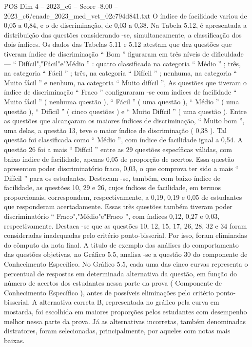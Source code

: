 \begin{textsample}{POS Dim 4 – 2023\_c6 – Score -8.00 – 2023\_c6/enade\_2023\_med\_vet\_02c794d841.txt}
O índice de facilidade variou de 0,05 a 0,84, e o de discriminação, de 0,03 a 0,38.
Na Tabela 5.12, é apresentada a distribuição das questões considerando -se, simultaneamente, a classificação dos dois índices.
Os dados das Tabelas 5.11 e 5.12 atestam que dez questões que tiveram índice de discriminação “ Bom ” figuraram em três níveis de dificuldade — “ Difícil","Fácil"e"Médio ” : quatro classificada na categoria “ Médio ” ; três, na categoria “ Fácil ” ; três, na categoria “ Difícil ” ; nenhuma, na categoria “ Muito fácil ” e nenhum, na categoria “ Muito difícil ”, As questões que tiveram o índice de discriminação “ Fraco ” configuraram -se com índices de facilidade “ Muito fácil ” ( nenhuma questão ), “ Fácil ” ( uma questão ), “ Médio ” ( uma questão ), “ Difícil ” ( cinco questões ) e “ Muito Difícil ” ( uma questão ).
Entre as questões que alcançaram os maiores índices de discriminação, “ Muito bom ”, uma delas, a questão 13, teve o maior índice de discriminação ( 0,38 ).
Tal questão foi classificada como “ Médio ”, com índice de facilidade igual a 0,54.
A questão 26 foi a mais “ Difícil ” entre as 29 questões específicas válidas, com baixo índice de facilidade, apenas 0,05 de proporção de acertos.
Essa questão apresentou poder discriminatório fraco, 0,03, o que comprova ter sido a mais “ Difícil ” para os estudantes.
Destacam -se, também, com baixo índice de facilidade, as questões 10, 29 e 26, cujos índices de facilidade, em termos proporcionais, correspondem, respectivamente, a 0,19, 0,19 e 0,05 de estudantes que responderam acertadamente.
Essas três questões também tiveram poder discriminatório “ Fraco","Médio"e"Fraco ”, com índices 0,12, 0,27 e 0,03, respectivamente.
Destaca -se que as questões 10, 12, 15, 17, 26, 28, 32 e 34 foram consideradas inadequadas pelo critério ponto-bisserial.
Por isso, foram eliminadas do cômputo da nota final.
A título de exemplo das análises do comportamento das questões objetivas, no Gráfico 5.5, analisa -se a questão 30 do componente de Conhecimento Específico.
No Gráfico 5.5, cada uma das cinco curvas representa o percentual de respostas em determinada alternativa da questão, em função do número de acertos dos estudantes nessa parte da prova ( Componente de Conhecimento Específico ), antes de possíveis eliminações pelo critério ponto-bisserial.
A alternativa correta B, representada no gráfico pela curva em mostarda, foi escolhida em maiores proporções pelos estudantes com desempenho melhor nessa parte da prova.
Já as alternativas incorretas, também denominadas distratores, foram selecionadas, principalmente, por aqueles com notas mais baixas.

\end{textsample}
